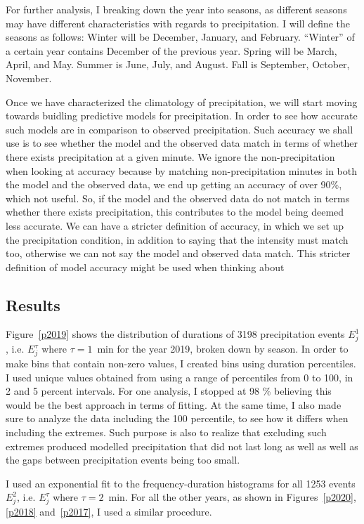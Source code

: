 \documentclass[11pt]{report}
\begin{document}
For further analysis, I breaking down the year into seasons, as different
seasons may have different characteristics with regards to precipitation. I
will define the seasons as follows: Winter will be December, January, and
February. ``Winter'' of a certain year contains December of the previous
year.  Spring will be March, April, and May. Summer is June, July, and
August. Fall is September, October, November.

Once we have characterized the climatology of precipitation, we will start
moving towards buidling predictive models for precipitation. In order to see
how accurate such models are in comparison to observed precipitation. Such
accuracy we shall use is to see whether the model and the observed data
match in terms of whether there exists precipitation at a given minute. We
ignore the non-precipitation when looking at accuracy because by matching
non-precipitation minutes in both the model and the observed data, we end up
getting an accuracy of over 90\%, which not useful. So, if the model and the
observed data do not match in terms whether there exists precipitation, this
contributes to the model being deemed less accurate. We can have a stricter
definition of accuracy, in which we set up the precipitation condition, in
addition to saying that the intensity must match too, otherwise we can not
say the model and observed data match. This stricter definition of model
accuracy might be used when thinking about

\subsection{Results}\label{sec:apcr}

Figure~\ref{p2019} shows the distribution of durations of 3198 precipitation
events $E_j^1$, i.e. $E_j^\tau$ where $\tau=1$~min for the year 2019, broken
down by season. In order to make bins that contain non-zero values, I
created bins using duration percentiles. I used unique values obtained from
using a range of percentiles from 0 to 100, in 2 and 5 percent
intervals. For one analysis, I stopped at 98 \% believing this would be the
best approach in terms of fitting. At the same time, I also made sure to
analyze the data including the 100 percentile, to see how it differs when
including the extremes. Such purpose is also to realize that excluding such
extremes produced modelled precipitation that did not last long as well as
well as the gaps between precipitation events being too small.

I used an exponential fit to the frequency-duration histograms for all 1253
events $E_j^2$, i.e. $E_j^\tau$ where $\tau=2$~min. For all the other years,
as shown in Figures~\ref{p2020}, \ref{p2018} and~\ref{p2017}, I used a
similar procedure.
\end{document}

